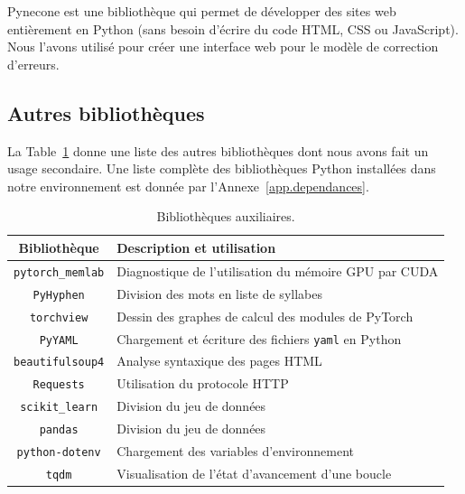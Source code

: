 Pynecone est une bibliothèque qui permet de développer des sites web entièrement en Python
(sans besoin d'écrire du code HTML, CSS ou JavaScript).
Nous l'avons utilisé pour créer une interface web pour le modèle de correction d'erreurs.

\subsection{Autres bibliothèques}%
\label{subsec.other-lib}

La Table~\ref{tab.other-lib} donne une liste des autres bibliothèques 
dont nous avons fait un usage secondaire.
Une liste complète des bibliothèques Python installées dans notre environnement 
est donnée par l'Annexe~\ref{app.dependances}.

\begin{table}[hbt]
    \begin{tabular}{|c|l|}
        \hline
        \textbf{Bibliothèque} & \textbf{Description et utilisation}                       \\
        \hline
        \verb|pytorch_memlab| & Diagnostique de l'utilisation du mémoire GPU par CUDA     \\
        \hline
        \verb|PyHyphen|       & Division des mots en liste de syllabes                    \\
        \hline
        \verb|torchview|      & Dessin des graphes de calcul des modules de PyTorch       \\
        \hline
        \verb|PyYAML|         & Chargement et écriture des fichiers \verb|yaml| en Python \\
        \hline
        \verb|beautifulsoup4| & Analyse syntaxique des pages HTML                         \\
        \hline
        \verb|Requests|       & Utilisation du protocole HTTP                             \\
        \hline
        \verb|scikit_learn|   & Division du jeu de données                                \\
        \hline
        \verb|pandas|         & Division du jeu de données                                \\
        \hline
        \verb|python-dotenv|  & Chargement des variables d'environnement                  \\
        \hline
        \verb|tqdm|           & Visualisation de l'état d'avancement d'une boucle         \\
        \hline
    \end{tabular}
    \caption{Bibliothèques auxiliaires.}
    \label{tab.other-lib}
\end{table}